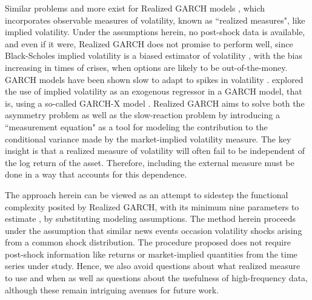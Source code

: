 \documentclass[11pt]{article}
\theoremstyle{definition}
\begin{document}
Similar problems and more exist for Realized GARCH models \citep{hansen2012realized}, which incorporates observable measures of volatility, known as  ``realized measures", like implied volatility.  Under the assumptions herein, no post-shock data is available, and even if it were, Realized GARCH does not promise to perform well, since Black-Scholes implied volatility is a biased estimator of volatility \citep{mayhew1995implied, christensen1998relation}, with the bias increasing in times of crises, when options are likely to be out-of-the-money.  GARCH models have been shown slow to adapt to spikes in volatility \citep{andersen2003modeling}.  \citet{engle2002new} explored the use of implied volatility as an exogenous regressor in a GARCH model, that is, using a so-called GARCH-X model \citep{RePEc:pra:mprapa:100301}.  Realized GARCH aims to solve both the asymmetry problem as well as the slow-reaction problem by introducing a ``measurement equation" as a tool for modeling the contribution to the conditional variance made by the market-implied volatility measure.  The key insight is that a realized measure of volatility will often fail to be independent of the log return of the asset.  Therefore, including the external measure must be done in a way that accounts for this dependence.

The approach herein can be viewed as an attempt to sidestep the functional complexity posited by Realized GARCH, with its minimum nine parameters to estimate \citep{sharma2016forecasting}, by substituting modeling assumptions.  The method herein proceeds under the assumption that similar news events occasion volatility shocks arising from a common shock distribution.  The procedure proposed does not require post-shock information like returns or market-implied quantities from the time series under study.  Hence, we also avoid questions about what realized measure to use and when as well as questions about the usefulness of high-frequency data, although these remain intriguing avenues for future work.
\end{document}
